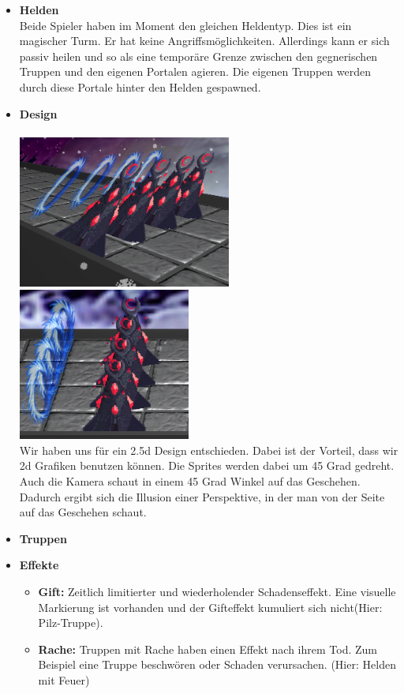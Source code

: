 \begin{itemize}
    \item \textbf{Helden} \\
        Beide Spieler haben im Moment den gleichen Heldentyp. Dies ist ein magischer Turm. Er hat keine Angriffsmöglichkeiten. Allerdings kann er sich passiv heilen und so als eine
        temporäre Grenze zwischen den gegnerischen Truppen und den eigenen Portalen agieren. Die eigenen Truppen werden durch diese Portale hinter den Helden gespawned.
    \item \textbf{Design} \\
        \\
        \includegraphics*[height=5cm]{resources/25d.png} \includegraphics*[height=5cm]{resources/25dtwo.png}\\
        Wir haben uns für ein 2.5d Design entschieden. Dabei ist der Vorteil, dass wir 2d Grafiken benutzen können. Die Sprites werden dabei um 45 Grad gedreht. Auch 
        die Kamera schaut in einem 45 Grad Winkel auf das Geschehen. Dadurch ergibt sich die Illusion einer Perspektive, in der man von der Seite auf das Geschehen schaut. 
    \item \textbf{Truppen}
    \item \textbf{Effekte}
    \begin{itemize}
        \item \textbf{Gift:}
        Zeitlich limitierter und wiederholender Schadenseffekt.
        Eine visuelle Markierung ist vorhanden und der Gifteffekt kumuliert sich nicht(Hier: Pilz-Truppe).
        \item \textbf{Rache:}
            Truppen mit Rache haben einen Effekt nach ihrem Tod. Zum Beispiel eine Truppe beschwören oder Schaden verursachen. (Hier: Helden mit Feuer)
    \end{itemize}
\end{itemize}

